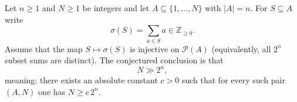 Let $n\ge 1$ and $N\ge 1$ be integers and let $A\subseteq\{1,\dots,N\}$ with $|A|=n$. For $S\subseteq A$ write
\[
\sigma(S)=\sum_{a\in S} a\in\mathbb{Z}_{\ge 0}.
\]
Assume that the map $S\mapsto\sigma(S)$ is injective on $\mathcal{P}(A)$ (equivalently, all $2^n$ subset sums are distinct). The conjectured conclusion is that
\[
N\gg 2^n,
\]
meaning: there exists an absolute constant $c>0$ such that for every such pair $(A,N)$ one has $N\ge c\,2^n$.
